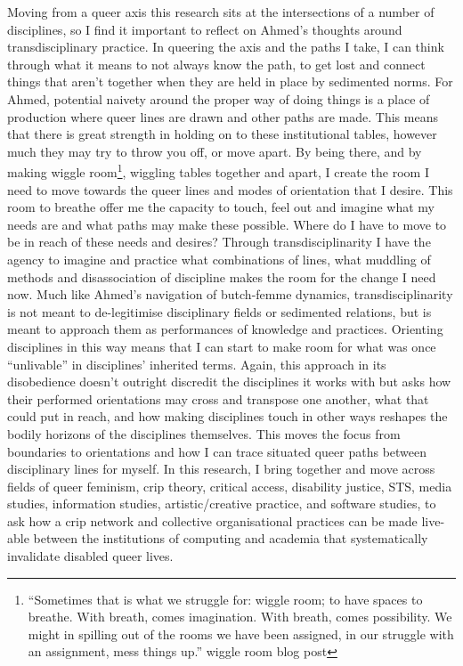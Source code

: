 Moving from a queer axis this research sits at the intersections of a
number of disciplines, so I find it important to reflect on Ahmed's
thoughts around transdisciplinary practice. In queering the axis and the
paths I take, I can think through what it means to not always know the
path, to get lost and connect things that aren't together when they are
held in place by sedimented norms. For Ahmed, potential naivety around
the proper way of doing things is a place of production where queer
lines are drawn and other paths are made. This means that there is great
strength in holding on to these institutional tables, however much they
may try to throw you off, or move apart. By being there, and by making
wiggle room\footnote{``Sometimes that is what we struggle for: wiggle
  room; to have spaces to breathe. With breath, comes imagination. With
  breath, comes possibility. We might in spilling out of the rooms we
  have been assigned, in our struggle with an assignment, mess things
  up.'' wiggle room blog post}, wiggling tables together and apart, I
create the room I need to move towards the queer lines and modes of
orientation that I desire. This room to breathe offer me the capacity to
touch, feel out and imagine what my needs are and what paths may make
these possible. Where do I have to move to be in reach of these needs
and desires? Through transdisciplinarity I have the agency to imagine
and practice what combinations of lines, what muddling of methods and
disassociation of discipline makes the room for the change I need now.
Much like Ahmed's navigation of butch-femme dynamics,
transdisciplinarity is not meant to de-legitimise disciplinary fields or
sedimented relations, but is meant to approach them as performances of
knowledge and practices. Orienting disciplines in this way means that I
can start to make room for what was once ``unlivable'' in disciplines'
inherited terms. Again, this approach in its disobedience doesn't
outright discredit the disciplines it works with but asks how their
performed orientations may cross and transpose one another, what that
could put in reach, and how making disciplines touch in other ways
reshapes the bodily horizons of the disciplines themselves. This moves
the focus from boundaries to orientations and how I can trace situated
queer paths between disciplinary lines for myself. In this research, I
bring together and move across fields of queer feminism, crip theory,
critical access, disability justice, STS, media studies, information
studies, artistic/creative practice, and software studies, to ask how a
crip network and collective organisational practices can be made
live-able between the institutions of computing and academia that
systematically invalidate disabled queer lives.

